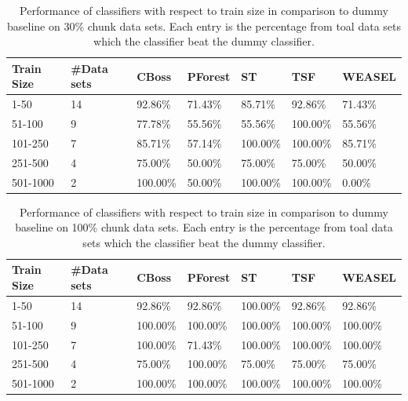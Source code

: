         \begin{table}[!ht]
            \setlength\extrarowheight{2pt} %
            \begin{tabularx}{\textwidth}{|X|X|X|X|X|X|X|}
            \hline
            \textbf{Train Size} & \textbf{\#Data sets} & \textbf{CBoss} & \textbf{PForest} & \textbf{ST} & \textbf{TSF} & \textbf{WEASEL} \\ \hline
                1-50 & 14 & 92.86\% & 71.43\% & 85.71\% & 92.86\% & 71.43\% \\ \hline
                51-100 & 9 & 77.78\% & 55.56\% & 55.56\% & 100.00\% & 55.56\% \\ \hline
                101-250 & 7 & 85.71\% & 57.14\% & 100.00\% & 100.00\% & 85.71\% \\ \hline
                251-500 & 4 & 75.00\% & 50.00\% & 75.00\% & 75.00\% & 50.00\% \\ \hline
                501-1000 & 2 &100.00\% & 50.00\% & 100.00\% & 100.00\% & 0.00\% \\ \hline
            \end{tabularx}
            \caption{Performance of classifiers with respect to train size in comparison to dummy baseline on 30\% chunk data sets. Each entry is the percentage from toal data sets which the classifier beat the dummy classifier.}
        \end{table}
        
        \begin{table}[!ht]
            \setlength\extrarowheight{2pt} %
            \begin{tabularx}{\textwidth}{|X|X|X|X|X|X|X|}
            \hline
            \textbf{Train Size} & \textbf{\#Data sets} & \textbf{CBoss} & \textbf{PForest} & \textbf{ST} & \textbf{TSF} & \textbf{WEASEL} \\ \hline
                1-50 & 14 & 92.86\% & 92.86\% & 100.00\% & 92.86\% & 92.86\% \\ \hline
                51-100 & 9 & 100.00\% & 100.00\% & 100.00\% & 100.00\% & 100.00\% \\ \hline
                101-250 & 7 & 100.00\% & 71.43\% & 100.00\% & 100.00\% & 100.00\% \\ \hline
                251-500 & 4 & 75.00\% & 100.00\% & 75.00\% & 75.00\% & 75.00\% \\ \hline
                501-1000 & 2 &100.00\% & 100.00\% & 100.00\% & 100.00\% & 100.00\% \\ \hline
            \end{tabularx}
            \caption{Performance of classifiers with respect to train size in comparison to dummy baseline on 100\% chunk data sets. Each entry is the percentage from toal data sets which the classifier beat the dummy classifier.}
        \end{table}
    
